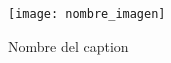 % 

\begin{figure}[H]
	\centering
		\texttt{[image: nombre\_imagen]}
	\caption{Nombre del caption}
	\label{fig:label_referencia}
\end{figure}